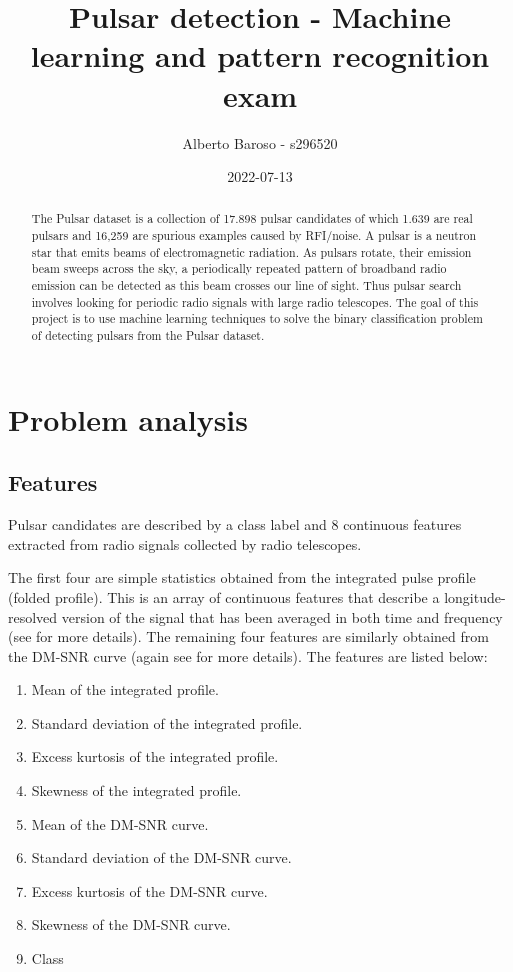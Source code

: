 \documentclass[12pt,a4paper]{article}
\begin{document}
\title{Pulsar detection - Machine learning and pattern recognition exam}
\author{Alberto Baroso - s296520}
\date{2022-07-13}
\maketitle
\clearpage

\begin{abstract}
    The Pulsar dataset \cite{stw656} is a collection of 17.898 pulsar candidates of which 1.639 are real pulsars and 16,259 are spurious examples caused by RFI/noise.
    A pulsar is a neutron star that emits beams of electromagnetic radiation.
    As pulsars rotate, their emission beam sweeps across the sky, a periodically repeated pattern of broadband radio emission can be detected as this beam crosses our line of sight.
    Thus pulsar search involves looking for periodic radio signals with large radio telescopes.
    The goal of this project is to use machine learning techniques to solve the binary classification problem of detecting pulsars from the Pulsar dataset.
\end{abstract}
\clearpage

\tableofcontents
\clearpage

\section{Problem analysis}

\subsection{Features}

Pulsar candidates are described by a class label and 8 continuous features extracted from radio signals collected by radio telescopes. \vspace{0.2cm}

The first four are simple statistics obtained from the integrated pulse profile (folded profile).
This is an array of continuous features that describe a longitude-resolved version of the signal that has been averaged in both time and frequency (see \cite{Lyon2016} for more details).
The remaining four features are similarly obtained from the DM-SNR curve (again see \cite{Lyon2016} for more details).
\vspace{0.2cm}
The features are listed below:

\begin{enumerate}
    \item Mean of the integrated profile.
    \item  Standard deviation of the integrated profile.
    \item Excess kurtosis of the integrated profile.
    \item Skewness of the integrated profile.
    \item Mean of the DM-SNR curve.
    \item Standard deviation of the DM-SNR curve.
    \item Excess kurtosis of the DM-SNR curve.
    \item Skewness of the DM-SNR curve.
    \item Class
\end{enumerate}
\end{document}
